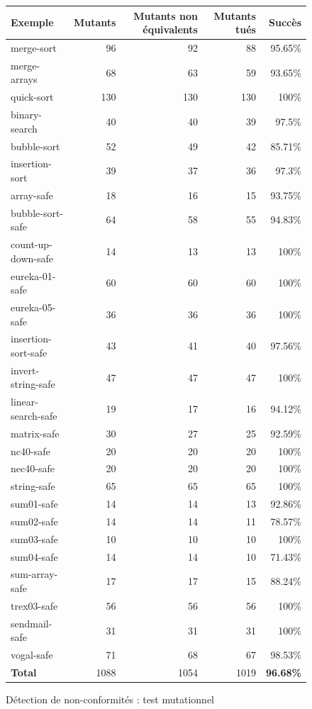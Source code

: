 \begin{figure}[tb]\scriptsize
  \begin{center}
    \begin{tabular}{lrrrr}
      \hline
      Exemple & Mutants & Mutants non équivalents & Mutants tués & Succès \\
      \hline
      merge-sort & 96  & 92 & 88 & 95.65\% \\ \hline
      merge-arrays & 68 & 63 & 59 & 93.65\% \\ \hline
      quick-sort & 130 & 130 & 130 & 100\% \\ \hline
      binary-search & 40 & 40 & 39 & 97.5\% \\ \hline
      bubble-sort & 52 & 49 & 42 & 85.71\% \\ \hline
      insertion-sort & 39 & 37 & 36 & 97.3\% \\ \hline
      array-safe & 18 & 16 & 15 & 93.75\% \\ \hline
      bubble-sort-safe & 64 & 58 & 55 & 94.83\% \\ \hline
      count-up-down-safe & 14 & 13 & 13 & 100\% \\ \hline
      eureka-01-safe & 60 & 60 & 60 & 100\% \\ \hline
      eureka-05-safe & 36 & 36 & 36 & 100\% \\ \hline
      insertion-sort-safe & 43 & 41 & 40 & 97.56\% \\ \hline
      invert-string-safe & 47 & 47 & 47 & 100\% \\ \hline
      linear-search-safe & 19 & 17 & 16 & 94.12\% \\ \hline
      matrix-safe & 30 & 27 & 25 & 92.59\% \\ \hline
      nc40-safe & 20 & 20 & 20 & 100\% \\ \hline
      nec40-safe & 20 & 20 & 20 & 100\% \\ \hline
      string-safe & 65 & 65 & 65 & 100\% \\ \hline
      sum01-safe & 14 & 14 & 13 & 92.86\% \\ \hline
      sum02-safe & 14 & 14 & 11 & 78.57\% \\ \hline
      sum03-safe & 10 & 10 & 10 & 100\% \\ \hline
      sum04-safe & 14 & 14 & 10 & 71.43\% \\ \hline
      sum-array-safe & 17 & 17 & 15 & 88.24\% \\ \hline
      trex03-safe & 56 & 56 & 56 & 100\% \\ \hline
      sendmail-safe & 31 & 31 & 31 & 100\% \\ \hline
      vogal-safe & 71 & 68 & 67 & 98.53\% \\ \hline
      \textbf{Total} & 1088 & 1054 & 1019 & \textbf{96.68\%} \\ \hline
    \end{tabular}
  \end{center}
  \vspace{-3mm}
  \caption{Détection de non-conformités : test mutationnel}
  \label{fig:scam-experiments2}
\end{figure}


